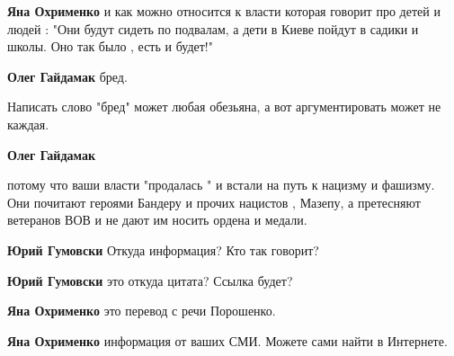 \begin{itemize}
\begin{itemize}

\textbf{Яна Охрименко} и как можно относится к власти которая говорит про детей и людей : "Они будут сидеть по подвалам, а дети в Киеве пойдут в садики и школы. Оно так было , есть и будет!"


\textbf{Олег Гайдамак} бред.


Написать слово "бред" может любая обезьяна, а вот аргументировать может не каждая.


\textbf{Олег Гайдамак} 

потому что ваши власти "продалась " и встали на путь к нацизму и фашизму. Они
почитают героями Бандеру и прочих нацистов , Мазепу, а претесняют ветеранов ВОВ
и не дают им носить ордена и медали.


\textbf{Юрий Гумовски} Откуда информация? Кто так говорит?


\textbf{Юрий Гумовски} это откуда цитата? Ссылка будет?


\textbf{Яна Охрименко} это перевод с речи Порошенко.


\textbf{Яна Охрименко} информация от ваших СМИ. Можете сами найти в Интернете.



\end{itemize}
\end{itemize}
